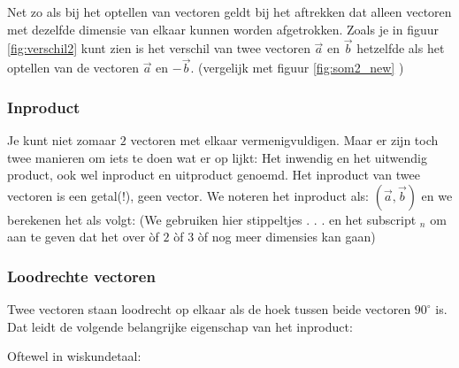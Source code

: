 
Net zo als bij het  optellen van vectoren geldt bij het aftrekken dat alleen vectoren met dezelfde dimensie van elkaar kunnen worden afgetrokken. 
Zoals je in figuur \ref{fig:verschil2} kunt zien is het verschil van twee vectoren $  \vec{a}  $  en $  \vec{b}  $ hetzelfde als het optellen van de vectoren $  \vec{a}  $  en $ - \vec{b}  $. (vergelijk met figuur  \ref{fig:som2_new} )


\subsubsection{Inproduct}
Je kunt niet zomaar $2$ vectoren met elkaar vermenigvuldigen. Maar er zijn toch twee manieren om iets te doen wat er op lijkt: Het inwendig en het uitwendig product, ook wel inproduct en uitproduct genoemd. 
Het inproduct van twee vectoren is een getal(!), geen vector. We noteren het inproduct als: $(\vec{a}, \vec{b}) $ en we berekenen het als volgt: (We gebruiken hier stippeltjes . . .  en het subscript $_n$ om aan te geven dat het over òf $2$ òf $3$ òf nog meer dimensies kan gaan)




\subsubsection{Loodrechte vectoren}
Twee vectoren staan loodrecht op elkaar als de hoek tussen beide vectoren $ 90^{\circ} $ is. Dat leidt de volgende belangrijke eigenschap van het inproduct: 


Oftewel in wiskundetaal: 

